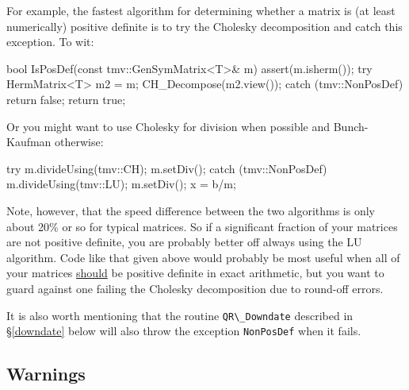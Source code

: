 \documentclass[twoside,letterpaper,11pt]{article}
\renewcommand{\tt}[1]{{\lstinline {#1}}}
\begin{document}
For example, the fastest algorithm for determining whether a matrix is 
(at least numerically) positive definite is to try the Cholesky decomposition
and catch this exception.  To wit:
\begin{tmvcode}
bool IsPosDef(const tmv::GenSymMatrix<T>& m)
{
    assert(m.isherm());
    try {
        HermMatrix<T> m2 = m;
        CH_Decompose(m2.view());
    }    
    catch (tmv::NonPosDef) {
        return false;
    }
    return true;
}
\end{tmvcode}
Or you might want to use Cholesky for division when possible and Bunch-Kaufman otherwise:
\begin{tmvcode}
try {
    m.divideUsing(tmv::CH);
    m.setDiv();
}
catch (tmv::NonPosDef) {
    m.divideUsing(tmv::LU);
    m.setDiv();
}
x = b/m;
\end{tmvcode}
Note, however, that the speed difference between the two algorithms is only about
20\% or so for typical matrices.  So if a significant fraction of your matrices are 
not positive definite, you are probably better off always using the LU algorithm.  
Code like that given above would probably be most useful when all of your 
matrices \underline{should} be positive definite in exact arithmetic, but you 
want to guard against one failing the Cholesky decomposition due to round-off
errors.

It is also worth mentioning that the routine \tt{QR\_Downdate} described in \S\ref{downdate}
below will also throw the exception \tt{NonPosDef} when it fails.

\subsection{Warnings}
\label{warnings}
\end{document}
